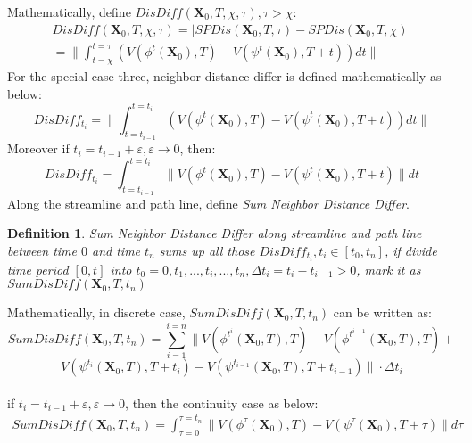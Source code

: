 \documentclass[
     11pt,         %
     a4paper,      %
     oneside,
     ]{article}
\newtheorem{mydef}{Definition}
\newcommand{\vect}[1]{\boldsymbol{#1}}
\begin{document}
Mathematically, define $DisDiff(\vect{X}_{0},T,\chi,\tau), \tau>\chi$:\\
\begin{eqnarray}
DisDiff(\vect{X}_{0},T,\chi,\tau)=\biggr\lvert SPDis(\vect{X}_{0},T,\tau)-SPDis(\vect{X}_{0},T,\chi)\biggr\rvert\\
=\biggr\lVert\int_{t=\chi}^{t=\tau} (V(\phi^{t}(\vect{X}_{0}),T)-V(\psi^{t}(\vect{X}_{0}),T+t)) dt\biggr\rVert
\end{eqnarray}
For the special case three, neighbor distance differ is defined mathematically as below:\\
$$DisDiff_{t_{i}}=\biggr\lVert\int_{t=t_{i-1}}^{t=t_{i}} (V(\phi^{t}(\vect{X}_{0}),T)-V(\psi^{t}(\vect{X}_{0}),T+t)) dt\biggr\rVert$$
Moreover if $t_{i}=t_{i-1}+\varepsilon, \varepsilon\rightarrow 0$, then:\\
$$DisDiff_{t_{i}}=\int_{t=t_{i-1}}^{t=t_{i}} \lVert V(\phi^{t}(\vect{X}_{0}),T)-V(\psi^{t}(\vect{X}_{0}),T+t)\rVert dt$$
Along the streamline and path line, define \textit{Sum Neighbor Distance Differ}.
\begin{mydef}
Sum Neighbor Distance Differ along streamline and path line between time $0$ and time $t_{n}$ sums up all those $DisDiff_{t_{i}}, t_{i}\in[t_{0}, t_{n}]$, if divide time period $[0, t]$ into $t_{0}=0, t_{1},...,t_{i},...,t_{n}, \Delta t_{i}=t_{i}-t_{i-1}>0$, mark it as $SumDisDiff(\vect{X}_{0},T,t_{n})$
\end{mydef}

Mathematically, in discrete case, $SumDisDiff(\vect{X}_{0},T,t_{n})$ can be written as:
\\
$$SumDisDiff(\vect{X}_{0},T,t_{n})=\sum_{i=1}^{i=n}\lVert V(\phi^{t^{i}}(\vect{X}_{0},T),T)-V(\phi^{t^{i-1}}(\vect{X}_{0},T),T)+$$
$$V(\psi^{t_{i}}(\vect{X}_{0},T),T+t_{i})-V(\psi^{t_{i-1}}(\vect{X}_{0},T),T+t_{i-1})\rVert\cdot \Delta t_{i}$$
\\
if $t_{i}=t_{i-1}+\varepsilon, \varepsilon\rightarrow 0$, then the continuity case as below:
\begin{eqnarray}\label{Equation:SumDisDiff}
SumDisDiff(\vect{X}_{0},T,t_{n})=\int_{\tau=0}^{\tau=t_{n}} \lVert V(\phi^{\tau}(\vect{X}_{0}),T)-V(\psi^{\tau}(\vect{X}_{0}),T+\tau)\rVert d\tau
\end{eqnarray}
\end{document}
